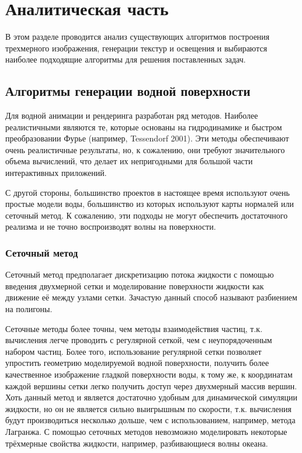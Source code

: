 \chapter{Аналитическая часть}


В этом разделе проводится анализ существующих алгоритмов построения трехмерного изображения, генерации текстур и освещения и выбираются наиболее подходящие алгоритмы для решения поставленных задач.


\section{Алгоритмы генерации водной поверхности}

Для водной анимации и рендеринга разработан ряд методов. Наиболее реалистичными являются те, которые основаны на гидродинамике и быстром преобразовании Фурье (например, Tessendorf 2001). Эти методы обеспечивают очень реалистичные результаты, но, к сожалению, они требуют значительного объема вычислений, что делает их непригодными для большой части интерактивных приложений.

С другой стороны, большинство проектов в настоящее время используют очень простые модели воды, большинство из которых используют карты нормалей или сеточный метод. К сожалению, эти подходы не могут обеспечить достаточного реализма и не точно воспроизводят волны на поверхности.

\subsection{Сеточный метод}

Сеточный метод предполагает дискретизацию потока жидкости с помощью введения двухмерной сетки и моделирование поверхности жидкости как движение её между узлами сетки. Зачастую данный способ называют разбиением на полигоны.

Сеточные методы более точны, чем методы взаимодействия частиц, т.к. вычисления легче проводить с регулярной сеткой, чем с неупорядоченным набором частиц. Более того, использование регулярной сетки позволяет упростить геометрию моделируемой водной поверхности, получить более качественное изображение гладкой поверхности воды, к тому же, к координатам каждой вершины сетки легко получить доступ через двухмерный массив вершин. Хоть данный метод и является достаточно удобным для динамической симуляции жидкости, но он не является сильно выигрышным по скорости, т.к. вычисления будут производиться несколько дольше, чем с использованием, например, метода Лагранжа. С помощью сеточных методов невозможно моделировать некоторые трёхмерные свойства жидкости, например, разбивающиеся волны океана. 

